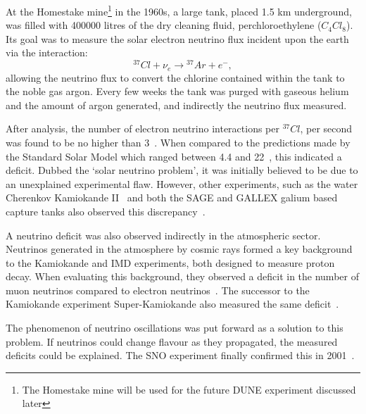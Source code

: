 At the Homestake mine\footnote{The Homestake mine will be used for the future DUNE experiment
    discussed later} in the 1960s, a large tank, placed 1.5 km underground, was filled with
400000 litres of the dry cleaning fluid, perchloroethylene ($C_{4}Cl_{8}$). Its goal was to
measure the solar electron neutrino flux incident upon the earth via the interaction:
\begin{equation} %
    {}^{37}Cl+\nu_{e}\rightarrow{}^{37}Ar+e^{-},
\end{equation} %
allowing the neutrino flux to convert the chlorine contained within the tank to the noble gas
argon. Every few weeks the tank was purged with gaseous helium and the amount of argon generated,
and indirectly the neutrino flux measured.

After analysis, the number of electron neutrino interactions per ${}^{37}Cl$, per second was found
to be no higher than 3~\cite{davis1968}. When compared to the predictions made by the Standard
Solar Model which ranged between 4.4 and 22~\cite{bahcall1968}, this indicated a deficit. Dubbed
the `solar neutrino problem', it was initially believed to be due to an unexplained experimental
flaw. However, other experiments, such as the water Cherenkov Kamiokande II~\cite{hirata1989} and
both the SAGE and GALLEX galium based capture tanks also observed this
discrepancy~\cite{abazov1991,anselmann1994}.

A neutrino deficit was also observed indirectly in the atmospheric sector. Neutrinos generated in
the atmosphere by cosmic rays formed a key background to the Kamiokande and IMD experiments, both
designed to measure proton decay. When evaluating this background, they observed a deficit in the
number of muon neutrinos compared to electron neutrinos~\cite{hirata1988, becker1992}. The
successor to the Kamiokande experiment Super-Kamiokande also measured the same
deficit~\cite{kajita1999}.

The phenomenon of neutrino oscillations was put forward as a solution to this problem. If
neutrinos could change flavour as they propagated, the measured deficits could be explained. The
SNO experiment finally confirmed this in 2001~\cite{ahmad2002}.

